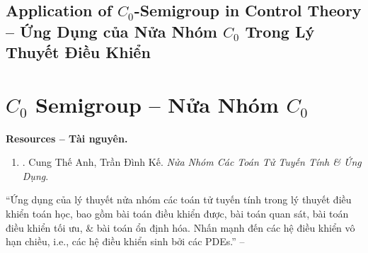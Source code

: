 \documentclass{article}
\begin{document}
\subsection{Application of $C_0$-Semigroup in Control Theory -- Ứng Dụng của Nửa Nhóm $C_0$ Trong Lý Thuyết Điều Khiển}


\section{$C_0$ Semigroup -- Nửa Nhóm $C_0$}
\textbf{\textsf{Resources -- Tài nguyên.}}
\begin{enumerate}
	\item \cite{Anh_Ke_semigroup}. {\sc Cung Thế Anh, Trần Đình Kế}. {\it Nửa Nhóm Các Toán Tử Tuyến Tính \& Ứng Dụng}.
\end{enumerate}
``Ứng dụng của lý thuyết nửa nhóm các toán tử tuyến tính trong lý thuyết điều khiển toán học, bao gồm bài toán điều khiển được, bài toán quan sát, bài toán điều khiển tối ưu, \& bài toán ổn định hóa. Nhấn mạnh đến các hệ điều khiển vô hạn chiều, i.e., các hệ điều khiển sinh bởi các PDEs.'' -- \cite[Chap. IV: {\it Ứng Dụng Trong Lý Thuyết Điều Khiển}]{Anh_Ke_semigroup}

\end{document}

